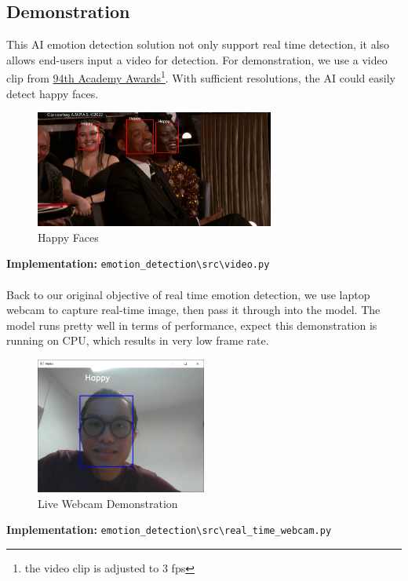 \documentclass[11pt,a4paper]{article}
\begin{document}
    \newpage
    \subsection{Demonstration}
    
    This AI emotion detection solution not only support real time detection, it also allows end-users input a video for detection. For demonstration, we use a video clip from \href{https://www.youtube.com/watch?v=myjEoDypUD8&pbjreload=102}{94th Academy Awards}\footnote{the video clip is adjusted to 3 fps}. With sufficient resolutions, the AI could easily detect happy faces.
    \begin{figure}[H]
        \centering
        \includegraphics[width = 0.7\textwidth]{written_report/pictures/happy.png}
        \caption{Happy Faces}
        \label{fig:happy}
    \end{figure}
    \noindent
    \textbf{Implementation:} \texttt{emotion\_detection\textbackslash src\textbackslash video.py} \\
    \\
    Back to our original objective of real time emotion detection, we use laptop webcam to capture real-time image, then pass it through into the model. The model runs pretty well in terms of performance, expect this demonstration is running on CPU, which results in very low frame rate.
    \begin{figure}[H]
        \centering
        \includegraphics[width = 0.5\textwidth]{written_report/pictures/live_demo.png}
        \caption{Live Webcam Demonstration}
        \label{fig:live_webcam}
    \end{figure}
    \noindent
    \textbf{Implementation:} \texttt{emotion\_detection\textbackslash src\textbackslash real\_time\_webcam.py}
    
\end{document}

